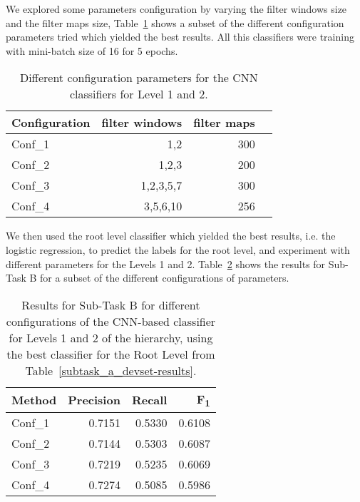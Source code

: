 \documentclass[11pt,a4paper]{article}
\begin{document}
We explored some parameters configuration by varying the filter windows size and
the filter maps size, Table~\ref{subtask_b_parameters} shows a subset of the different
configuration parameters tried which yielded the best results. All this classifiers
 were training with mini-batch size of 16 for 5 epochs.

\begin{table}[!h]
\begin{center}
\begin{tabular}{|l|r|r|r|}
\hline\centering\textbf{Configuration}  & \textbf{filter windows} &  \textbf{filter maps} \\
\hline
 Conf\_1 & 1,2       & 300 \\
 Conf\_2 & 1,2,3     & 200 \\
 Conf\_3 & 1,2,3,5,7 & 300 \\
 Conf\_4 & 3,5,6,10  & 256 \\
\hline
\end{tabular}
\end{center}
\caption{\label{subtask_b_parameters} Different configuration parameters for the CNN classifiers for Level 1 and 2.}
\end{table}

We then used the root level classifier which yielded the best results, i.e. the
logistic regression, to predict the labels for the root level, and experiment
with different parameters for the Levels 1 and 2. Table~\ref{level-1-2} shows
the results for Sub-Task B for a subset of the different configurations of parameters.

\begin{table}[!h]
\begin{center}
\begin{tabular}{|l|r|r|r|}
\hline\centering\textbf{Method}  & \textbf{Precision} &  \textbf{Recall} &  \textbf{F\textsubscript{1}}\\
\hline
 Conf\_1 & 0.7151 & 0.5330 & 0.6108 \\
 Conf\_2 & 0.7144 & 0.5303 & 0.6087 \\
 Conf\_3 & 0.7219 & 0.5235 & 0.6069 \\
 Conf\_4 & 0.7274 & 0.5085 & 0.5986 \\
\hline
\end{tabular}
\end{center}
\caption{\label{level-1-2} Results for Sub-Task B for different configurations
of the CNN-based classifier for Levels 1 and 2 of the hierarchy, using the best
classifier for the Root Level from Table~\ref{subtask_a_devset-results}.}
\end{table}
\end{document}
